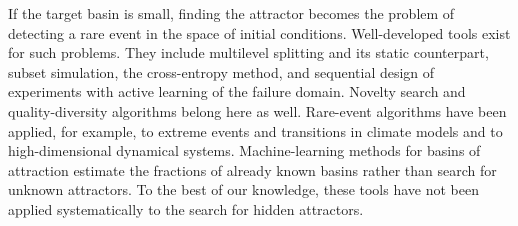 If the target basin is small, finding the attractor becomes the problem of detecting a rare event in the space of initial conditions. Well-developed tools exist for such problems. They include multilevel splitting\cite{Glasserman1999,CerouGuyader2007,Cerou2019AMS} and its static counterpart, subset simulation,\cite{AuBeck2001} the cross-entropy method,\cite{Rubinstein1999CE} and sequential design of experiments with active learning of the failure domain.\cite{Bect2012,Echard2011AKMCS} Novelty search and quality-diversity algorithms belong here as well.\cite{LehmanStanley2011,MouretClune2015,Pugh2016QD,CullyDemiris2018} Rare-event algorithms have been applied, for example, to extreme events and transitions in climate models\cite{Ragone2018,Lestang2018TAMS} and to high-dimensional dynamical systems.\cite{Baars2021AMS} Machine-learning methods for basins of attraction\cite{Wang2022HAL,Cao2025AL,Yang2024PRR,DNNBasins2021,Gameiro2025,Haerter2026BBT} estimate the fractions of already known basins rather than search for unknown attractors. To the best of our knowledge, these tools have not been applied systematically to the search for hidden attractors.

